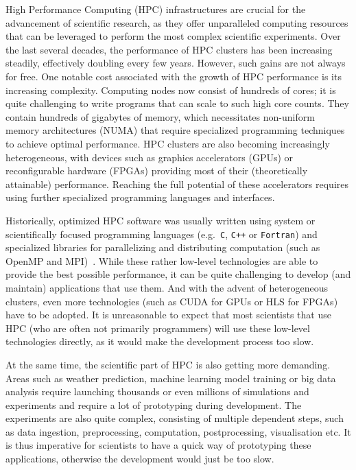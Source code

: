 High Performance Computing (HPC) infrastructures are crucial for the advancement of scientific
research, as they offer unparalleled computing resources that can be leveraged to perform the most
complex scientific experiments. Over the last several decades, the performance of HPC clusters
has been increasing steadily, effectively doubling every few years. However, such gains are not
always for free. One notable cost associated with the growth of HPC performance is its
increasing complexity. Computing nodes now consist of hundreds of cores; it is quite challenging
to write programs that can scale to such high core counts. They contain hundreds of gigabytes of
memory, which necessitates non-uniform memory architectures (NUMA) that require specialized
programming techniques to achieve optimal performance. HPC clusters are also becoming
increasingly heterogeneous, with devices such as graphics accelerators (GPUs) or reconfigurable
hardware (FPGAs) providing most of their (theoretically attainable) performance. Reaching the
full potential of these accelerators requires using further specialized programming languages
and interfaces.

Historically, optimized HPC software was usually written using system or scientifically focused
programming languages (e.g.~\texttt{C}, \texttt{C++} or \texttt{Fortran}) and specialized libraries
for parallelizing and distributing computation (such as OpenMP and MPI)~\cite{mpistudy}. While
these rather low-level technologies are able to provide the best possible performance, it can be
quite challenging to develop (and maintain) applications that use them. And with the advent of
heterogeneous clusters, even more technologies (such as CUDA for GPUs or HLS for FPGAs) have to
be adopted. It is unreasonable to expect that most scientists that use HPC (who are often not
primarily programmers) will use these low-level technologies directly, as it would make the
development process too slow.

At the same time, the scientific part of HPC is also getting more demanding. Areas such as weather
prediction, machine learning model training or big data analysis require launching thousands or
even millions of simulations and experiments and require a lot of prototyping during development.
The experiments are also quite complex, consisting of multiple dependent steps, such as data
ingestion, preprocessing, computation, postprocessing, visualisation etc. It is thus imperative for
scientists to have a quick way of prototyping these applications, otherwise the development
would just be too slow.

